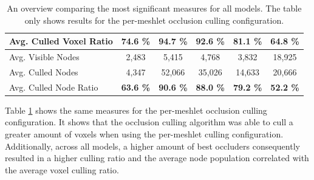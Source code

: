 \begin{table}[!htb]
\begin{tabular}{|lccccc|}
    \multicolumn{1}{|l|}{Avg. Culled Voxel Ratio}   & \multicolumn{1}{c|}{\textbf{74.6 \%}}         & \multicolumn{1}{c|}{\textbf{94.7 \%}}         & \multicolumn{1}{c|}{\textbf{92.6 \%}} & \multicolumn{1}{c|}{\textbf{81.1 \%}}     & \multicolumn{1}{c|}{\textbf{64.8 \%}}     \\ \hline
    \multicolumn{1}{|l|}{Avg. Visible Nodes}        & \multicolumn{1}{c|}{2,483}                    & \multicolumn{1}{c|}{5,415}                    & \multicolumn{1}{c|}{4,768}            & \multicolumn{1}{c|}{3,832}                & \multicolumn{1}{c|}{18,925}               \\
    \multicolumn{1}{|l|}{Avg. Culled Nodes}         & \multicolumn{1}{c|}{4,347}                    & \multicolumn{1}{c|}{52,066}                   & \multicolumn{1}{c|}{35,026}           & \multicolumn{1}{c|}{14,633}               & \multicolumn{1}{c|}{20,666}               \\
    \multicolumn{1}{|l|}{Avg. Culled Node Ratio}    & \multicolumn{1}{c|}{\textbf{63.6 \%}}         & \multicolumn{1}{c|}{\textbf{90.6 \%}}         & \multicolumn{1}{c|}{\textbf{88.0 \%}} & \multicolumn{1}{c|}{\textbf{79.2 \%}}     & \multicolumn{1}{c|}{\textbf{52.2 \%}}     \\ \hline
  \end{tabular}
  \caption{An overview comparing the most significant measures for all models. 
  The table only shows results for the per-meshlet occlusion culling configuration.}
  \label{tbl:culling-result-overview-pmoc}
\end{table}


\noindent
Table \ref{tbl:culling-result-overview-pmoc} shows the same measures for the per-meshlet occlusion culling 
configuration. It shows that the occlusion culling algorithm was able to cull a greater amount of voxels 
when using the per-meshlet culling configuration. Additionally, across all models, a higher amount of 
best occluders consequently resulted in a higher culling ratio and the average node population correlated 
with the average voxel culling ratio.

